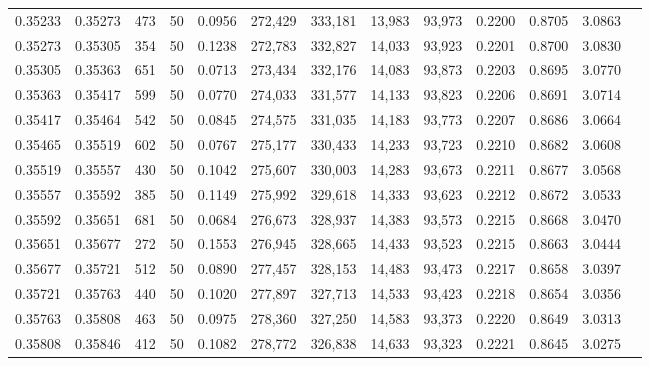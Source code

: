 \begin{tabular}{rrrrrrrrrrrrr}
0.35233 & 0.35273 &   473 &  50 &                                     0.0956 & 272,429 & 333,181 &  13,983 &  93,973 & 0.2200 & 0.8705 & 3.0863 \\
0.35273 & 0.35305 &   354 &  50 &                                     0.1238 & 272,783 & 332,827 &  14,033 &  93,923 & 0.2201 & 0.8700 & 3.0830 \\
0.35305 & 0.35363 &   651 &  50 &                                     0.0713 & 273,434 & 332,176 &  14,083 &  93,873 & 0.2203 & 0.8695 & 3.0770 \\
0.35363 & 0.35417 &   599 &  50 &                                     0.0770 & 274,033 & 331,577 &  14,133 &  93,823 & 0.2206 & 0.8691 & 3.0714 \\
0.35417 & 0.35464 &   542 &  50 &                                     0.0845 & 274,575 & 331,035 &  14,183 &  93,773 & 0.2207 & 0.8686 & 3.0664 \\
0.35465 & 0.35519 &   602 &  50 &                                     0.0767 & 275,177 & 330,433 &  14,233 &  93,723 & 0.2210 & 0.8682 & 3.0608 \\
0.35519 & 0.35557 &   430 &  50 &                                     0.1042 & 275,607 & 330,003 &  14,283 &  93,673 & 0.2211 & 0.8677 & 3.0568 \\
0.35557 & 0.35592 &   385 &  50 &                                     0.1149 & 275,992 & 329,618 &  14,333 &  93,623 & 0.2212 & 0.8672 & 3.0533 \\
0.35592 & 0.35651 &   681 &  50 &                                     0.0684 & 276,673 & 328,937 &  14,383 &  93,573 & 0.2215 & 0.8668 & 3.0470 \\
0.35651 & 0.35677 &   272 &  50 &                                     0.1553 & 276,945 & 328,665 &  14,433 &  93,523 & 0.2215 & 0.8663 & 3.0444 \\
0.35677 & 0.35721 &   512 &  50 &                                     0.0890 & 277,457 & 328,153 &  14,483 &  93,473 & 0.2217 & 0.8658 & 3.0397 \\
0.35721 & 0.35763 &   440 &  50 &                                     0.1020 & 277,897 & 327,713 &  14,533 &  93,423 & 0.2218 & 0.8654 & 3.0356 \\
0.35763 & 0.35808 &   463 &  50 &                                     0.0975 & 278,360 & 327,250 &  14,583 &  93,373 & 0.2220 & 0.8649 & 3.0313 \\
0.35808 & 0.35846 &   412 &  50 &                                     0.1082 & 278,772 & 326,838 &  14,633 &  93,323 & 0.2221 & 0.8645 & 3.0275 \\

\end{tabular}
